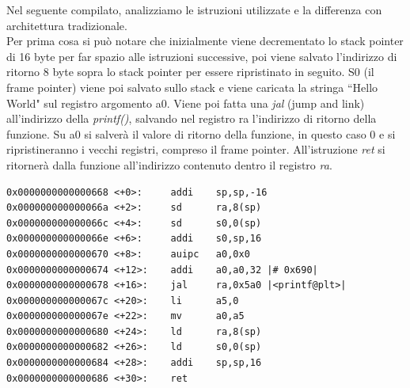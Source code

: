 Nel seguente compilato, analizziamo le istruzioni utilizzate e la differenza con architettura tradizionale.\\
Per prima cosa si può notare che inizialmente viene decrementato lo stack pointer di 16 byte per far spazio alle istruzioni successive, poi viene salvato l'indirizzo di ritorno 8 byte sopra lo stack pointer per essere ripristinato in seguito. 
S0 (il frame pointer) viene poi salvato sullo stack e viene caricata la stringa ``Hello World" sul registro argomento a0. Viene poi fatta una \textit{jal} (jump and link) all'indirizzo della \textit{printf()}, salvando nel registro ra l'indirizzo di ritorno della funzione. Su a0 si salverà il valore di ritorno della funzione, in questo caso 0 e si ripristineranno i vecchi registri, compreso il frame pointer. All'istruzione \textit{ret} si ritornerà dalla funzione all'indirizzo contenuto dentro il registro \textit{ra}.  
\begin{verbatim}
0x0000000000000668 <+0>:     addi    sp,sp,-16
0x000000000000066a <+2>:     sd      ra,8(sp)
0x000000000000066c <+4>:     sd      s0,0(sp)
0x000000000000066e <+6>:     addi    s0,sp,16
0x0000000000000670 <+8>:     auipc   a0,0x0
0x0000000000000674 <+12>:    addi    a0,a0,32 |# 0x690|
0x0000000000000678 <+16>:    jal     ra,0x5a0 |<printf@plt>|
0x000000000000067c <+20>:    li      a5,0
0x000000000000067e <+22>:    mv      a0,a5
0x0000000000000680 <+24>:    ld      ra,8(sp)
0x0000000000000682 <+26>:    ld      s0,0(sp)
0x0000000000000684 <+28>:    addi    sp,sp,16
0x0000000000000686 <+30>:    ret
\end{verbatim}
